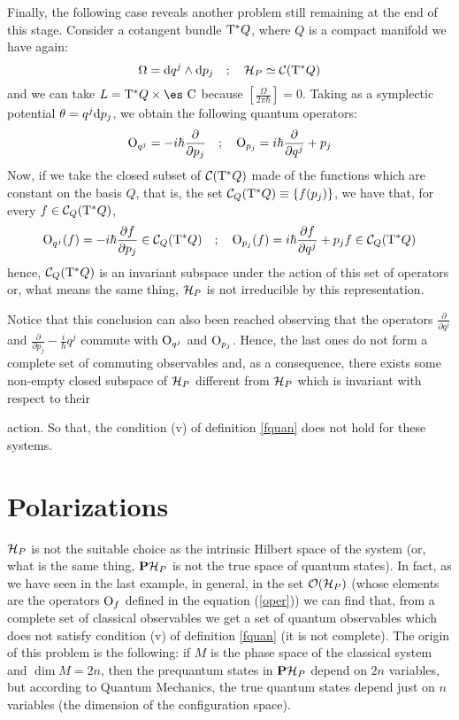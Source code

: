 \documentclass[12pt]{article}
\theoremstyle{plain}
\def\dst{\(}
\def\derpar#1#2{\frac{\partial{#1}}{\partial{#2}}}
\def\d{{\rm d}}
\def\C{{\cal C}}
\def\H{{\cal H}}
\def\Op{{\rm O}}
\def\Complex{\mbox{\es C}}
\def\Tan{{\rm T}}
\begin{document}
Finally, the following case reveals another problem
still remaining at the end of this stage.
Consider a cotangent bundle $\Tan^*Q$,
where $Q$ is a compact manifold we have again:
$$
\Omega = \d q^j \wedge \d p_j
\quad ; \quad
\H_P \simeq \C (\Tan^*Q)
$$
and we can take $L = \Tan^*Q \times \Complex$
because $[\frac{\Omega}{2\pi\hbar}] = 0$. Taking as a symplectic
potential
$\theta = q^j \d p_j$, we obtain the following quantum operators:
$$
\Op_{q^j} = -i\hbar \derpar{}{p_j}
\quad ; \quad
\Op_{p_j} = i\hbar \derpar{}{q^j} + p_j
$$
Now, if we take the closed subset of $\C (\Tan^*Q)$
made of the functions which are constant on the basis $Q$,
that is, the set $\C_Q(\Tan^*Q) \equiv \{ f(p_j) \}$,
we have that, for every $f \in \C_Q(\Tan^*Q)$,
$$
\Op_{q^j}(f) = -i\hbar \derpar{f}{p_j} \in \C_Q(\Tan^*Q)
\quad ; \quad
\Op_{p_j}(f) = i\hbar \derpar{f}{q^j} + p_jf  \in \C_Q(\Tan^*Q)
$$
hence, $\C_Q(\Tan^*Q)$
is an invariant subspace under the action
of this set of operators or, what means the same thing,
$\H_P$ is not irreducible by this representation.

Notice that this conclusion can also been reached
observing that the operators
\dst\derpar{}{q^j}\) and \dst\derpar{}{p_j}-\frac{i}{\hbar}q^j\)
commute with $\Op_{q^j}$ and $\Op_{p_j}$.
Hence, the last ones do not form a
complete set of commuting observables and,
as a consequence, there exists some non-empty closed subspace
of $\H_P$ different from $\H_P$ which is invariant with respect to their

action.
So that, the condition (v) of definition \ref{fquan} does not hold for
these systems.



\section{Polarizations}
\protect \label{gqpol}


$\H_P$ is not the suitable choice as the intrinsic Hilbert space
of the system (or, what is the same thing, ${\bf P}\H_P$ is not
the true space of quantum states). In fact, as we have seen in the
last example, in general, in the set ${\cal O}(\H_P)$ (whose
elements are the operators $\Op_f$ defined in the equation
(\ref{oper})) we can find that, from a complete set of classical
observables we get a set of quantum observables which does not
satisfy condition (v) of definition \ref{fquan} (it is not
complete). The origin of this problem is the following: if $M$ is
the phase space of the classical system and $\dim M =2n$, then the
prequantum states in ${\bf P}\H_P$ depend on $2n$ variables, but
according to Quantum Mechanics, the true quantum states depend
just on $n$ variables (the dimension of the configuration space).
\end{document}
